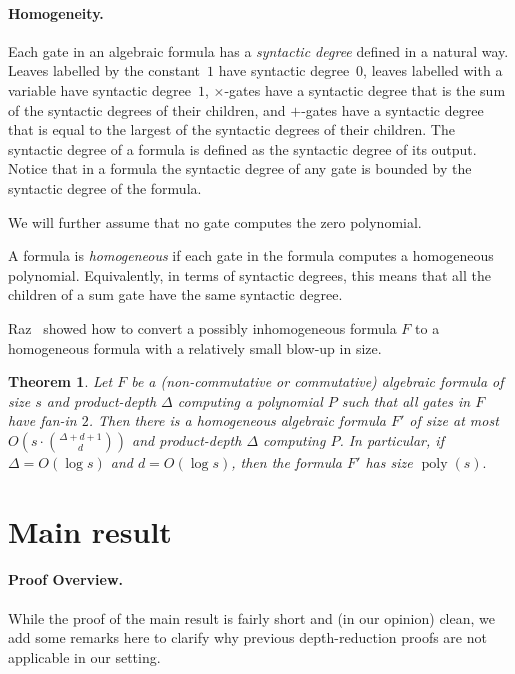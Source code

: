 \documentclass[10pt,a4paper]{article}
\newtheorem{theorem}{Theorem}
\newcommand{\poly}{\mathop{\mathrm{poly}}}
\begin{document}
\paragraph{Homogeneity.} Each gate in an algebraic formula has a \emph{syntactic degree} defined in a natural way. Leaves labelled by the constant~$1$ have syntactic degree~\(0\),  leaves labelled with a variable have syntactic degree~$1$, $\times$-gates have a syntactic degree that is the sum of the syntactic degrees of their children, and $+$-gates have a syntactic degree that is equal to the largest of the syntactic degrees of their children.
 The syntactic degree of a formula is defined as the syntactic degree of its output. Notice that in a formula  the syntactic degree of any gate is bounded by the syntactic degree of the formula. 

We will further assume that no gate computes the zero polynomial.

A formula is \emph{homogeneous} if each gate in the formula computes a homogeneous polynomial. Equivalently, in terms of syntactic degrees, this means that all the children of a sum gate have the same syntactic degree.

Raz~\cite{Raztensor} showed how to convert a possibly inhomogeneous formula $F$ to a homogeneous formula with a relatively small blow-up in size.

\begin{theorem}
\label{thm:Raz}
 Let $F$ be a (non-commutative or commutative) algebraic formula of size $s$ and product-depth $\Delta$ computing a polynomial $P$ such that all gates in $F$ have fan-in $2$. Then there is a \emph{homogeneous} algebraic formula $F'$ of size at most $O\left(s\cdot \binom{\Delta + d+1}{d}\right)$ and product-depth $\Delta$ computing $P$.  In particular, if $\Delta = O(\log s)$ and $d = O(\log s)$, then the formula $F'$ has size $\poly(s).$
\end{theorem}


\section{Main result}
\label{sec:mainlbd}


\paragraph{Proof Overview.} While the proof of the main result is fairly short and (in our opinion) clean, we add some remarks here to clarify why previous depth-reduction proofs are not applicable in our setting. 
\end{document}
